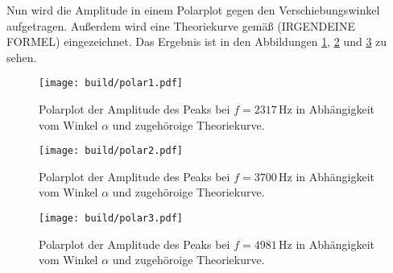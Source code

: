 Nun wird die Amplitude in einem Polarplot gegen den Verschiebungswinkel aufgetragen.
Außerdem wird eine Theoriekurve gemäß (IRGENDEINE FORMEL) eingezeichnet. Das Ergebnis
ist in den Abbildungen \ref{fig:polar1}, \ref{fig:polar2} und \ref{fig:polar3} zu sehen.

\begin{figure}
  \centering
  \texttt{[image: build/polar1.pdf]}
  \caption{Polarplot der Amplitude des Peaks bei $f=2317$\,Hz in Abhängigkeit vom
  Winkel $\alpha$ und zugehöroige Theoriekurve.}
  \label{fig:polar1}
\end{figure}
\begin{figure}
  \centering
  \texttt{[image: build/polar2.pdf]}
  \caption{Polarplot der Amplitude des Peaks bei $f=3700$\,Hz in Abhängigkeit vom
  Winkel $\alpha$ und zugehöroige Theoriekurve.}
  \label{fig:polar2}
\end{figure}
\begin{figure}
  \centering
  \texttt{[image: build/polar3.pdf]}
  \caption{Polarplot der Amplitude des Peaks bei $f=4981$\,Hz in Abhängigkeit vom
  Winkel $\alpha$ und zugehöroige Theoriekurve.}
  \label{fig:polar3}
\end{figure}
